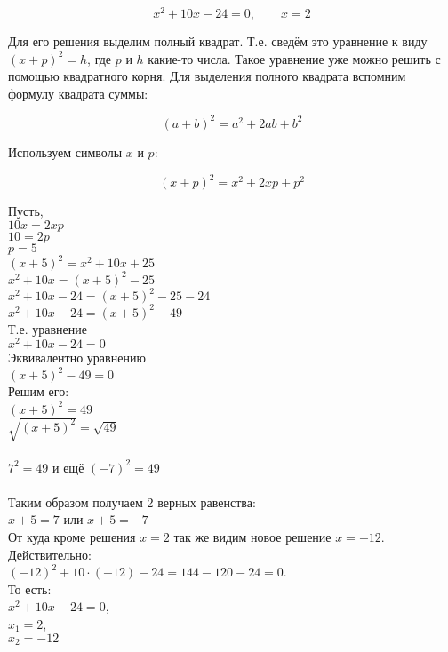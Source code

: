 \begin{equation*}
  x^2 + 10x - 24 = 0, \qquad x = 2
\end{equation*}

Для его решения выделим полный квадрат. Т.е. сведём это уравнение к виду $(x + p)^2 = h$, где $p$ и $h$ какие-то числа. Такое уравнение уже можно решить с помощью квадратного корня. Для выделения полного квадрата вспомним формулу квадрата суммы:

\begin{equation}
  \left( a + b \right)^2 = a^2 + 2ab + b^2
\end{equation}

Используем символы $x$ и $p$:

\begin{equation*}
  \left( x + p \right)^2 = x^2 + 2xp + p^2
\end{equation*}

Пусть,\\
$ 10x = 2xp $ \\
$ 10 = 2p   $ \\
$ p = 5     $ \\
$ \left( x + 5 \right)^2 = x^2 + 10x + 25 $ \\
$ x^2 + 10x = \left( x + 5 \right)^2 - 25 $ \\
$ x^2 + 10x - 24 = \left( x + 5 \right)^2 - 25 - 24$ \\
$ x^2 + 10x - 24 = \left( x + 5 \right)^2 - 49$ \\
Т.е. уравнение \\
$ x^2 + 10x - 24 = 0 $ \\
Эквивалентно уравнению \\
$ \left( x + 5 \right)^2 - 49 = 0 $ \\
Решим его: \\
$ \left( x + 5 \right)^2 = 49 $ \\
$ \sqrt{\left( x + 5 \right)^2} = \sqrt{49} $ \\
\\
$ 7^2 = 49$ и ещё $ (-7)^2 = 49 $ \\
\\
Таким образом получаем 2 верных равенства: \\
$x + 5 = 7$ \qquad или \qquad $x + 5 = -7$ \\
От куда кроме решения $x=2$ так же видим новое решение $x=-12$. Действительно:\\
$(-12)^2 + 10 \cdot (-12) - 24 = 144 - 120 -24 = 0$.\\
То есть: \\
$ x^2 + 10x - 24 = 0 $, \\
$ x_1 = 2 $, \\
$ x_2 = -12 $

